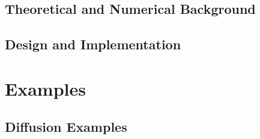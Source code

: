 \documentclass[letterpaper]{book}
\begin{document}



\chapter{Theoretical and Numerical Background}
\label{chap:Numerics}





\chapter{Design and Implementation}
\label{chap:Design}





% 
% 
% 



\sloppy

\part{Examples}
\label{part:Examples}



\renewcommand{\ptctitle}{Example Contents}
\parttoc

\chapter{Diffusion Examples}


% 


% 

% 
% 

% 


\end{document}
